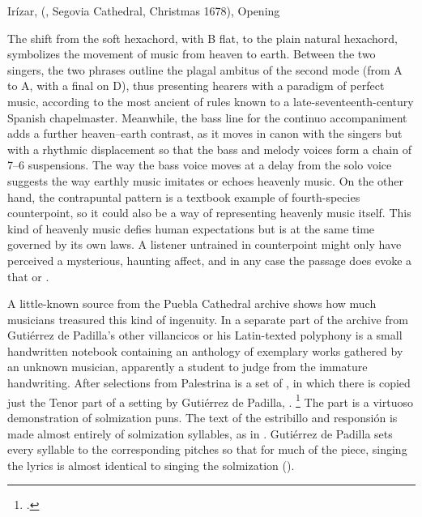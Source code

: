 \begin{musicexample}
    \caption{Irízar,  (, Segovia
    Cathedral, Christmas 1678), Opening}
    \label{mus:Irizar-Que_musica_celestial}
\end{musicexample}

The shift from the  soft hexachord, with B flat, to the plain
natural hexachord, symbolizes the movement of music from heaven to earth.
Between the two singers, the two phrases outline the plagal ambitus of the
second mode (from A to A, with a final on D), thus presenting hearers with a
paradigm of perfect music, according to the most ancient of rules known to a
late-seventeenth-century Spanish chapelmaster.
Meanwhile, the bass line for the continuo accompaniment adds a further
heaven--earth contrast, as it moves in canon with the singers but with a
rhythmic displacement so that the bass and melody voices form a chain of 7--6
suspensions.
The way the bass voice moves at a delay from the solo voice suggests the way
earthly music imitates or echoes heavenly music.
On the other hand, the contrapuntal pattern is a textbook example of
fourth-species counterpoint, so it could also be a way of representing heavenly
music itself.  
This kind of heavenly music defies human expectations but is at the same time
governed by its own laws.
A listener untrained in counterpoint might only have perceived a mysterious,
haunting affect, and in any case the passage does evoke a  that  or .

A little-known source from the Puebla Cathedral archive shows how much
musicians treasured this kind of ingenuity.
In a separate part of the archive from Gutiérrez de Padilla's other villancicos
or his Latin-texted polyphony is a small handwritten notebook containing an
anthology of exemplary works gathered by an unknown musician, apparently a
student to judge from the immature handwriting.
After selections from Palestrina is a set of , in which there is copied just the Tenor part of a setting by
Gutiérrez de Padilla, .%
    \footnote{.}
The part is a virtuoso demonstration of solmization puns.
The text of the estribillo and responsión is made almost entirely of
solmization syllables, as in .
Gutiérrez de Padilla sets every syllable to the corresponding pitches so that
for much of the piece, singing the lyrics is almost identical to singing the
solmization ().

